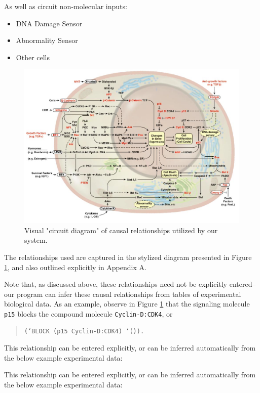 \documentclass[11pt]{article}
\begin{document}
As well as circuit non-molecular inputs:
\begin{itemize}
\item DNA Damage Sensor
\item Abnormality Sensor
\item Other cells
\end{itemize}

\begin{figure}[htb]
\centering
\includegraphics[width=.9\linewidth]{../data/cancer_biology/BIO-KNOWLEDGE-DIAGRAM.png}
\caption{\label{fig:cell-image}Visual "circuit diagram" of causal relationships utilized by our system.}
\end{figure}

The relationships used are captured in the stylized diagram presented in Figure \ref{fig:cell-image}, and also outlined explicitly in Appendix A.

Note that, as discussed above, these relationships need not be explicitly entered--our program can infer these causal relationships from tables of experimental biological data. As an example, observe in Figure \ref{fig:cell-image} that the signaling molecule \texttt{p15} blocks the compound molecule \texttt{Cyclin-D:CDK4}, or

\begin{quote}
\begin{verbatim}
(‘BLOCK (p15 Cyclin-D:CDK4) ‘()).
\end{verbatim}
\end{quote}

This relationship can be entered explicitly, or can be inferred automatically from the below example experimental data:

This relationship can be entered explicitly, or can be inferred automatically from the below example experimental data:
\end{document}
